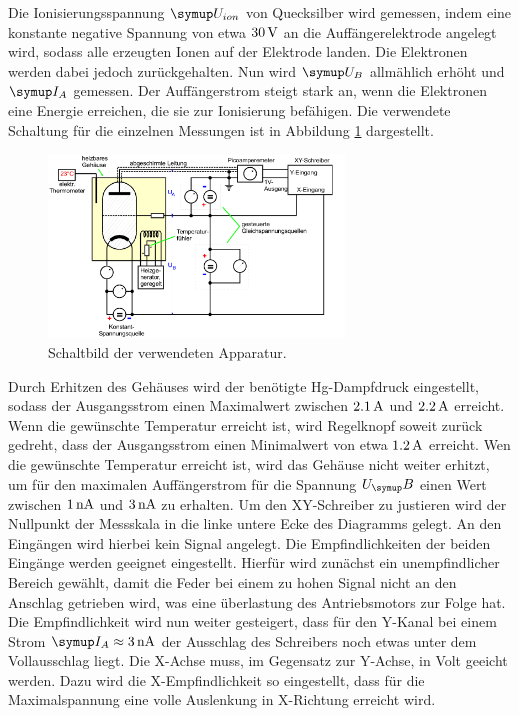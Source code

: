 Die Ionisierungsspannung $\su{U_{ion}}$ von Quecksilber wird gemessen, indem eine
konstante negative Spannung von etwa $30\,\si{\volt}$ an die Auffängerelektrode angelegt
wird, sodass alle erzeugten Ionen auf der Elektrode landen. Die Elektronen werden
dabei jedoch zurückgehalten.
Nun wird $\su{U_B}$ allmählich erhöht und $\su{I_A}$ gemessen. Der Auffängerstrom
steigt stark an, wenn die Elektronen eine Energie erreichen, die sie zur
Ionisierung befähigen.
Die verwendete Schaltung für die einzelnen Messungen ist in Abbildung \ref{fig:schalt}
dargestellt.
\begin{figure}
  \centering
  \includegraphics[width=0.7\textwidth]{bilder/schalt.jpg}
  \caption{Schaltbild der verwendeten Apparatur\cite{601}.}
  \label{fig:schalt}
\end{figure}
Durch Erhitzen des Gehäuses wird der benötigte Hg-Dampfdruck eingestellt, sodass
der Ausgangsstrom einen Maximalwert zwischen $2.1\,\si{\ampere}$ und $2.2\,\si{\ampere}$ erreicht.
Wenn die gewünschte Temperatur erreicht ist, wird Regelknopf soweit zurück
gedreht, dass der Ausgangsstrom einen Minimalwert von etwa $1.2\,\si{\ampere}$ erreicht.
Wen die gewünschte Temperatur erreicht ist, wird das Gehäuse nicht weiter erhitzt,
um für den maximalen Auffängerstrom für die Spannung $U_\su{B}$ einen Wert zwischen
$1\,\si{\nano\ampere}$ und $3\,\si{\nano\ampere}$ zu erhalten.
Um den XY-Schreiber zu justieren wird der Nullpunkt der Messskala in die
linke untere Ecke des Diagramms gelegt. An den Eingängen wird hierbei kein
Signal angelegt. Die Empfindlichkeiten der beiden Eingänge werden geeignet
eingestellt. Hierfür wird zunächst ein unempfindlicher Bereich gewählt, damit
die Feder bei einem zu hohen Signal nicht an den Anschlag getrieben wird, was
eine überlastung des Antriebsmotors zur Folge hat. Die Empfindlichkeit wird nun
weiter gesteigert, dass für den Y-Kanal bei einem Strom $\su{I_A}\approx3\nA$
der Ausschlag des Schreibers noch etwas unter dem Vollausschlag liegt. Die
X-Achse muss, im Gegensatz zur Y-Achse, in Volt geeicht werden. Dazu wird
die X-Empfindlichkeit so eingestellt, dass für die Maximalspannung eine volle
Auslenkung in X-Richtung erreicht wird.

